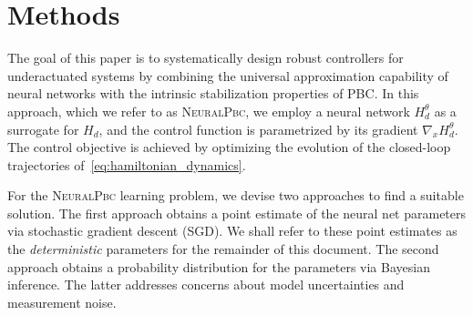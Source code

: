 \section{Methods} \label{sec:methods}


The goal of this paper is to systematically design robust controllers for
underactuated systems by combining the universal approximation capability of
neural networks with the intrinsic stabilization properties of PBC.
%
%
%
In this approach, which we refer to as \textsc{NeuralPbc}, we employ a neural
network $H_d^\theta$ as a surrogate for $H_d$, and the control function is
parametrized by its gradient $\nabla_x H_d^\theta$.
%
The control objective is achieved by optimizing the evolution of the closed-loop
trajectories of~\eqref{eq:hamiltonian_dynamics}.
%
%


For the \textsc{NeuralPbc} learning problem, we devise two approaches to find a
suitable solution. 
%
The first approach obtains a point estimate of the neural net parameters via
stochastic gradient descent (SGD). We shall refer to these point estimates as
the \textit{deterministic} parameters for the remainder of this document.
%
The second approach obtains a probability distribution for the parameters via
Bayesian inference.
%
The latter addresses concerns about model uncertainties and measurement noise.


